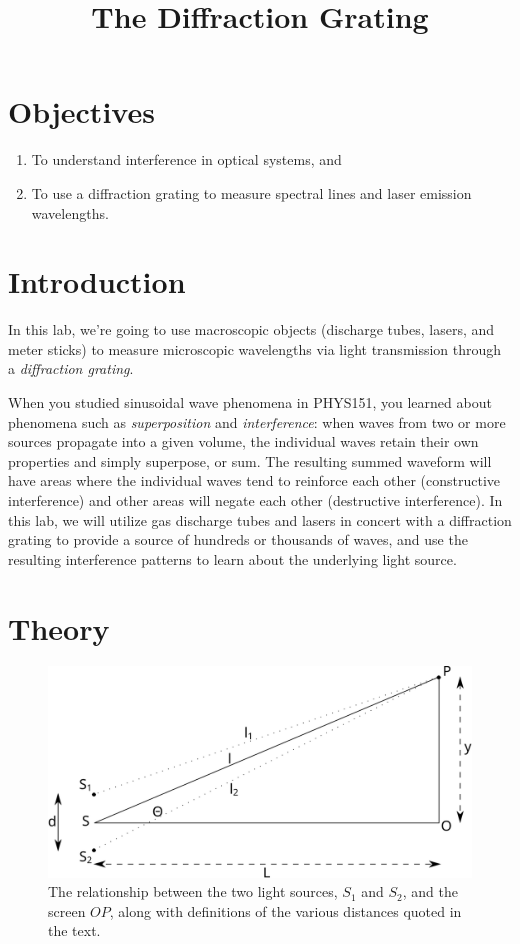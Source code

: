 \documentclass[12pt]{article}
\title{The Diffraction Grating}
\author{}
\date{}
\newcommand{\Sone}{\ensuremath{S_1}\xspace}
\newcommand{\Stwo}{\ensuremath{S_2}\xspace}
\begin{document}
\maketitle

\section{Objectives}
\label{sec:objectives}

\begin{enumerate}
\item To understand interference in optical systems, and
\item To use a diffraction grating to measure spectral lines and laser
  emission wavelengths.
\end{enumerate}

\section{Introduction}
\label{sec:introduction}

In this lab, we're going to use macroscopic objects (discharge tubes,
lasers, and meter sticks) to measure microscopic wavelengths via light
transmission through a \textit{diffraction grating}.

When you studied sinusoidal wave phenomena in PHYS151, you learned
about phenomena such as \textit{superposition} and
\textit{interference}: when waves from two or more sources propagate
into a given volume, the individual waves retain their own properties
and simply superpose, or sum.  The resulting summed waveform will have
areas where the individual waves tend to reinforce each other
(constructive interference) and other areas will negate each other
(destructive interference).  In this lab, we will utilize gas
discharge tubes and lasers in concert with a diffraction grating to
provide a source of hundreds or thousands of waves, and use the
resulting interference patterns to learn about the underlying light
source. 

\section{Theory}
\label{sec:theory}

\begin{figure}
  \centering
\includegraphics[width=2\textwidth/3]{figures/definitions}  
  \caption{The relationship between the two light sources, \Sone and
    \Stwo, and the screen $OP$, along with definitions of the various
    distances quoted in the text.}
  \label{fig:sources}
\end{figure}
\end{document}
